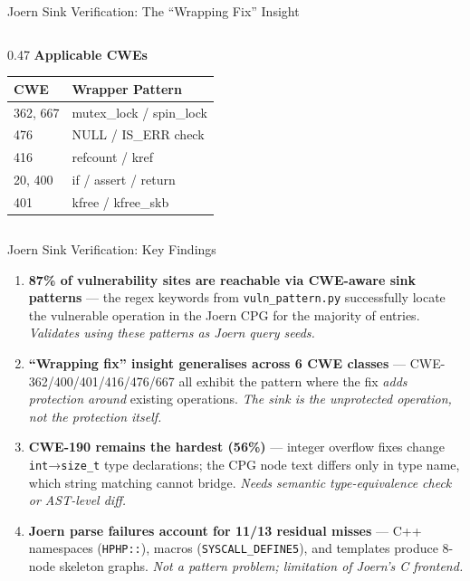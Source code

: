 \documentclass[aspectratio=169,10pt]{beamer}
\begin{document}
\begin{frame}{Joern Sink Verification: The ``Wrapping Fix'' Insight}
\begin{columns}[T]
\begin{column}{0.47\textwidth}
  \vspace{0.4em}
  {\small\textbf{Applicable CWEs}}\\[3pt]
  {\scriptsize
  \renewcommand{\arraystretch}{1.15}
  \begin{tabular}{ll}
    \toprule
    \textbf{CWE} & \textbf{Wrapper Pattern} \\
    \midrule
    362, 667 & mutex\_lock / spin\_lock \\
    476 & NULL / IS\_ERR check \\
    416 & refcount / kref \\
    20, 400 & if / assert / return \\
    401 & kfree / kfree\_skb \\
    \bottomrule
  \end{tabular}}

\end{column}
\end{columns}
\end{frame}


\begin{frame}{Joern Sink Verification: Key Findings}
  \begin{enumerate}
    \item[\textcolor{hit}{\faIcon{crosshairs}}]
      \textbf{87\% of vulnerability sites are reachable via CWE-aware sink patterns} —
      the regex keywords from \texttt{vuln\_pattern.py} successfully locate
      the vulnerable operation in the Joern CPG for the majority of entries.
      \textit{Validates using these patterns as Joern query seeds.}

    \vspace{0.3em}
    \item[\textcolor{c1}{\faIcon{lightbulb}}]
      \textbf{``Wrapping fix'' insight generalises across 6 CWE classes} —
      CWE-362/400/401/416/476/667 all exhibit the pattern where the fix
      \emph{adds protection around} existing operations.
      \textit{The sink is the unprotected operation, not the protection itself.}

    \vspace{0.3em}
    \item[\textcolor{warn}{\faIcon{exclamation-triangle}}]
      \textbf{CWE-190 remains the hardest (56\%)} — integer overflow fixes
      change \texttt{int}→\texttt{size\_t} type declarations; the CPG node
      text differs only in type name, which string matching cannot bridge.
      \textit{Needs semantic type-equivalence check or AST-level diff.}

    \vspace{0.3em}
    \item[\textcolor{miss}{\faIcon{skull-crossbones}}]
      \textbf{Joern parse failures account for 11/13 residual misses} —
      C++ namespaces (\texttt{HPHP::}), macros (\texttt{SYSCALL\_DEFINE5}),
      and templates produce 8-node skeleton graphs.
      \textit{Not a pattern problem; limitation of Joern's C frontend.}
  \end{enumerate}
\end{frame}
\end{document}
